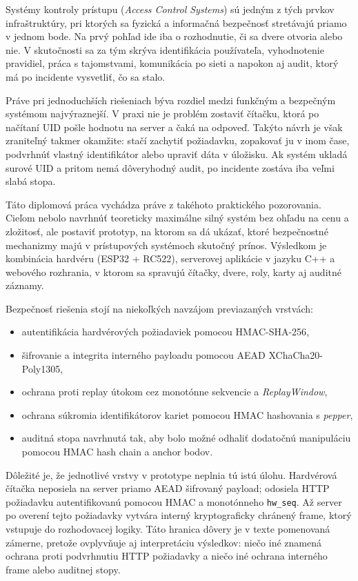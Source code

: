 \documentclass[journal,a4paper,onecolumn]{IEEEtran}
\begin{document}
Systémy kontroly prístupu (\emph{Access Control Systems}) sú jedným z tých prvkov infraštruktúry, pri ktorých sa fyzická a informačná bezpečnosť stretávajú priamo v jednom bode. Na prvý pohľad ide iba o rozhodnutie, či sa dvere otvoria alebo nie. V skutočnosti sa za tým skrýva identifikácia používateľa, vyhodnotenie pravidiel, práca s tajomstvami, komunikácia po sieti a napokon aj audit, ktorý má po incidente vysvetliť, čo sa stalo.

Práve pri jednoduchších riešeniach býva rozdiel medzi funkčným a bezpečným systémom najvýraznejší. V praxi nie je problém zostaviť čítačku, ktorá po načítaní UID pošle hodnotu na server a čaká na odpoveď. Takýto návrh je však zraniteľný takmer okamžite: stačí zachytiť požiadavku, zopakovať ju v inom čase, podvrhnúť vlastný identifikátor alebo upraviť dáta v úložisku. Ak systém ukladá surové UID a pritom nemá dôveryhodný audit, po incidente zostáva iba veľmi slabá stopa.

Táto diplomová práca vychádza práve z takéhoto praktického pozorovania. Cieľom nebolo navrhnúť teoreticky maximálne silný systém bez ohľadu na cenu a zložitosť, ale postaviť prototyp, na ktorom sa dá ukázať, ktoré bezpečnostné mechanizmy majú v prístupových systémoch skutočný prínos. Výsledkom je kombinácia hardvéru (ESP32 + RC522), serverovej aplikácie v jazyku C++ a webového rozhrania, v ktorom sa spravujú čítačky, dvere, roly, karty aj auditné záznamy.

Bezpečnosť riešenia stojí na niekoľkých navzájom previazaných vrstvách:

\begin{itemize}[leftmargin=*,itemsep=2pt]
  \item autentifikácia hardvérových požiadaviek pomocou HMAC-SHA-256\cite{FIPS1981},
  \item šifrovanie a integrita interného payloadu pomocou AEAD XChaCha20-Poly1305\cite{RFC8439,XChaChaDraft,LibsodiumXChaChaDoc},
  \item ochrana proti replay útokom cez monotónne sekvencie a \emph{ReplayWindow},
  \item ochrana súkromia identifikátorov kariet pomocou HMAC hashovania s \emph{pepper},
  \item auditná stopa navrhnutá tak, aby bolo možné odhaliť dodatočnú manipuláciu pomocou HMAC hash chain a anchor bodov\cite{SchneierKelsey1999}.
\end{itemize}

Dôležité je, že jednotlivé vrstvy v prototype neplnia tú istú úlohu. Hardvérová čítačka neposiela na server priamo AEAD šifrovaný payload; odosiela HTTP požiadavku autentifikovanú pomocou HMAC a monotónneho \texttt{hw\_seq}. Až server po overení tejto požiadavky vytvára interný kryptograficky chránený frame, ktorý vstupuje do rozhodovacej logiky. Táto hranica dôvery je v texte pomenovaná zámerne, pretože ovplyvňuje aj interpretáciu výsledkov: niečo iné znamená ochrana proti podvrhnutiu HTTP požiadavky a niečo iné ochrana interného frame alebo auditnej stopy.
\end{document}
